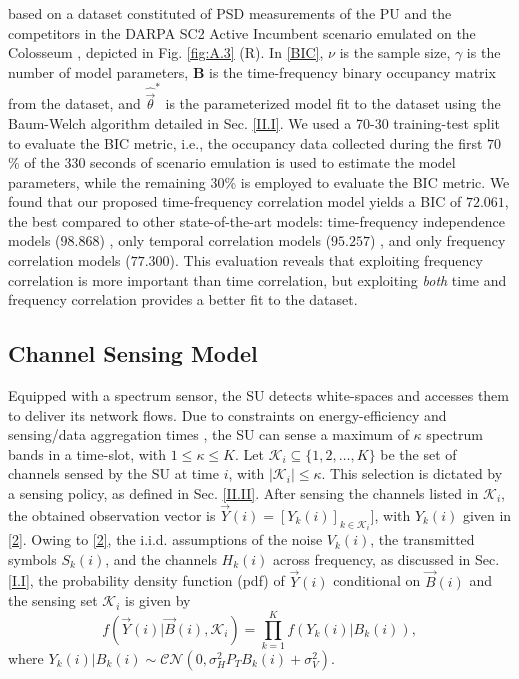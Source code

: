 \documentclass[10pt, twocolumn]{IEEEtran}
\begin{document}
based on a dataset constituted of PSD measurements of the PU and the competitors in the DARPA SC2 Active Incumbent scenario emulated on the Colosseum \cite{DARPA:SC2, DARPA:SC2c2api, DARPA:ActiveIncumbent, DARPA:SC2scenarios}, depicted in Fig. \ref{fig:A.3} (R). In \eqref{BIC}, $\nu$ is the sample size, $\gamma$ is the number of model parameters, $\mathbf{B}$ is the time-frequency binary occupancy matrix from the dataset, and $\hat{\vec{\theta}}^*$ is the parameterized model fit to the dataset using the Baum-Welch algorithm detailed in Sec. \ref{II.I}. We used a 70-30 training-test split to evaluate the BIC metric, i.e., the occupancy data collected during the first $70$\% of the $330$ seconds of scenario emulation is used to estimate the model parameters, while the remaining $30$\% is employed to evaluate the BIC metric. We found that our proposed time-frequency correlation model yields a BIC of $72.061$, the best compared to other state-of-the-art models: time-frequency independence models ($98.868$) \cite{WCL:4, WCL:10, WCL:9, WCL:11, WCL:8}, only temporal correlation models ($95.257$) \cite{WCL:5}, and only frequency correlation models ($77.300$). This evaluation reveals that exploiting frequency correlation is more important than time correlation, but exploiting \emph{both} time and frequency correlation provides a better fit to the dataset.
\vspace{-3mm}

\subsection{Channel Sensing Model}\label{I.III}
Equipped with a spectrum sensor, the SU detects white-spaces and accesses them to deliver its network flows. Due to constraints on energy-efficiency and sensing/data aggregation times \cite{WCL:3}, the SU can sense a maximum of $\kappa$ spectrum bands in a time-slot, with $1{\leq}\kappa{\leq}K$. Let $\mathcal{K}_{i}{\subseteq}\{1,2,\dots,K\}$ be the set of channels sensed by the SU at time $i$, with $|\mathcal{K}_{i}|{\leq}\kappa$. This selection is dictated by a sensing policy, as defined in Sec. \ref{II.II}. After sensing the channels listed in $\mathcal{K}_{i}$, the obtained observation vector is $\vec{Y}(i){=}[Y_{k}(i)]_{k{\in}\mathcal{K}_{i}}]$, with  $Y_{k}(i)$ given in \eqref{2}. Owing to \eqref{2}, the  i.i.d. assumptions of the noise $V_{k}(i)$, the transmitted symbols $S_{k}(i)$, and the channels $H_{k}(i)$ across frequency, as discussed in Sec. \ref{I.I}, the probability density function (pdf) of $\vec{Y}(i)$ conditional on $\vec{B}(i)$ and the sensing set $\mathcal{K}_{i}$ is given by
\vspace{-4mm}
\begin{equation}\label{8}
    f(\vec{Y}(i)|\vec{B}(i),\mathcal{K}_{i})=\prod_{k=1}^{K}f(Y_{k}(i)|B_{k}(i)),
\end{equation}
where $Y_{k}(i)|B_{k}(i)\sim\mathcal{CN}(0,\sigma_{H}^{2}P_{T}B_{k}(i)+\sigma_{V}^{2})$.
\vspace{-2mm}
\end{document}
